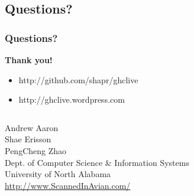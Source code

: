 \documentclass[xcolor=pdftex,dvipsnames,table]{beamer}
\begin{document}
\subsection{Questions?}
\begin{frame}[plain]
  \label{thanks}
  \frametitle{Questions?}
  \begin{center}
    \textbf{Thank you!}
  \end{center}
  \begin{itemize}
  \item http://github.com/shapr/ghclive
  \item http://ghclive.wordpress.com
  \end{itemize}
  \vspace{0.5cm}
  \begin{center}
    \begin{minipage}{11cm}
      \begin{columns}[c]
        Andrew Aaron\\
        Shae Erisson\\
        PengCheng Zhao\\
        Dept. of Computer Science \& Information Systems\\
        University of North Alabama\\
        \url{http://www.ScannedInAvian.com/}
      \end{columns}
    \end{minipage}
  \end{center}
\end{frame}


\end{document}
